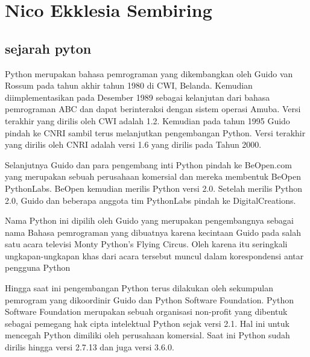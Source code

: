 \section{Nico Ekklesia Sembiring}
\subsection{sejarah pyton}
Python merupakan bahasa pemrograman yang dikembangkan oleh Guido van Rossum pada tahun akhir tahun 1980 di CWI, Belanda. Kemudian diimplementasikan pada Desember 1989 sebagai kelanjutan dari bahasa pemrograman ABC dan dapat berinteraksi dengan sistem operasi Amuba. Versi terakhir yang dirilis oleh CWI adalah 1.2. Kemudian pada tahun 1995 Guido pindah ke CNRI sambil terus melanjutkan pengembangan Python. Versi terakhir yang dirilis oleh CNRI adalah versi 1.6 yang dirilis pada Tahun 2000. 

Selanjutnya Guido dan para pengembang inti Python pindah ke BeOpen.com yang merupakan sebuah perusahaan komersial dan mereka membentuk BeOpen PythonLabs. BeOpen kemudian merilis Python versi 2.0. Setelah merilis Python 2.0, Guido dan beberapa anggota tim PythonLabs pindah ke DigitalCreations. 

Nama Python ini dipilih oleh Guido yang merupakan pengembangnya sebagai nama Bahasa pemrograman yang dibuatnya karena kecintaan Guido pada salah satu acara televisi Monty Python’s Flying Circus. Oleh karena itu seringkali ungkapan-ungkapan khas dari acara tersebut muncul dalam korespondensi antar pengguna Python

Hingga saat ini pengembangan Python terus dilakukan oleh sekumpulan pemrogram yang dikoordinir Guido dan Python Software Foundation. Python Software Foundation merupakan sebuah organisasi non-profit yang dibentuk sebagai pemegang hak cipta intelektual Python sejak versi 2.1. Hal ini untuk mencegah Python dimiliki oleh perusahaan komersial. Saat ini Python sudah dirilis hingga versi 2.7.13 dan juga versi 3.6.0.

